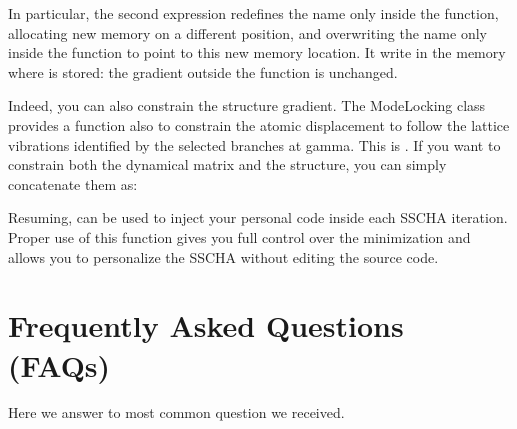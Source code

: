 \documentclass[a4paper,11pt,english]{sphinxmanual}
\begin{document}
\sphinxAtStartPar
In particular, the second expression redefines the name  only inside the function, allocating new memory on a different position, and overwriting the name  only inside the function to point to this new memory location.  It  write in the memory where  is stored: the gradient outside the function is unchanged.

\sphinxAtStartPar
Indeed, you can also constrain the structure gradient. The ModeLocking class provides a function also to constrain the atomic displacement to follow the lattice vibrations identified by the selected branches at gamma.
This is . If you want to constrain both the dynamical matrix and the structure, you can simply concatenate them as:

\begin{sphinxVerbatim}[commandchars=\\\{\}]
  
         
         

  
\end{sphinxVerbatim}

\sphinxAtStartPar
Resuming,  can be used to inject your personal code inside each SSCHA iteration. Proper use of this function gives you full control over the minimization and allows you to personalize the SSCHA without editing the source code.

\sphinxstepscope


\chapter{Frequently Asked Questions (FAQs)}
\label{\detokenize{faq:frequently-asked-questions-faqs}}\label{\detokenize{faq::doc}}
\sphinxAtStartPar
Here we answer to most common question we received.
\end{document}
